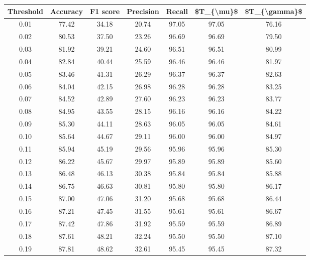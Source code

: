 \begin{tabular}{|c|c|c|c|c|c|c|}
\hline
 Threshold &  Accuracy &  F1 score &  Precision &  Recall &  \$T\_\{\textbackslash mu\}\$ &  \$T\_\{\textbackslash gamma\}\$ \\
\hline
      0.01 &     77.42 &     34.18 &      20.74 &   97.05 &      97.05 &         76.16 \\
      0.02 &     80.53 &     37.50 &      23.26 &   96.69 &      96.69 &         79.50 \\
      0.03 &     81.92 &     39.21 &      24.60 &   96.51 &      96.51 &         80.99 \\
      0.04 &     82.84 &     40.44 &      25.59 &   96.46 &      96.46 &         81.97 \\
      0.05 &     83.46 &     41.31 &      26.29 &   96.37 &      96.37 &         82.63 \\
      0.06 &     84.04 &     42.15 &      26.98 &   96.28 &      96.28 &         83.25 \\
      0.07 &     84.52 &     42.89 &      27.60 &   96.23 &      96.23 &         83.77 \\
      0.08 &     84.95 &     43.55 &      28.15 &   96.16 &      96.16 &         84.22 \\
      0.09 &     85.30 &     44.11 &      28.63 &   96.05 &      96.05 &         84.61 \\
      0.10 &     85.64 &     44.67 &      29.11 &   96.00 &      96.00 &         84.97 \\
      0.11 &     85.94 &     45.19 &      29.56 &   95.96 &      95.96 &         85.30 \\
      0.12 &     86.22 &     45.67 &      29.97 &   95.89 &      95.89 &         85.60 \\
      0.13 &     86.48 &     46.13 &      30.38 &   95.84 &      95.84 &         85.88 \\
      0.14 &     86.75 &     46.63 &      30.81 &   95.80 &      95.80 &         86.17 \\
      0.15 &     87.00 &     47.06 &      31.20 &   95.68 &      95.68 &         86.44 \\
      0.16 &     87.21 &     47.45 &      31.55 &   95.61 &      95.61 &         86.67 \\
      0.17 &     87.42 &     47.86 &      31.92 &   95.59 &      95.59 &         86.89 \\
      0.18 &     87.61 &     48.21 &      32.24 &   95.50 &      95.50 &         87.10 \\
      0.19 &     87.81 &     48.62 &      32.61 &   95.45 &      95.45 &         87.32 \\

\end{tabular}
